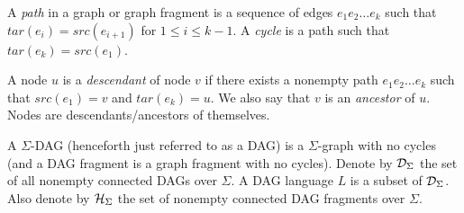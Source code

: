 \documentclass[11pt]{article}
\begin{document}
A \textit{path} in a graph or graph fragment is a sequence of edges
$e_1e_2\ldots e_k$ such that $tar(e_i) = src(e_{i+1})$ for $1 \le i \le k-1$. A
\textit{cycle} is a path such that $tar(e_k) = src(e_1)$. 

A node $u$ is a \textit{descendant} of node $v$ if there exists a nonempty path
$e_1e_2\ldots e_k$ such that $src(e_1) = v$ and $tar(e_k)=u$. We also say that
$v$ is an \textit{ancestor} of $u$. Nodes are descendants/ancestors of
themselves. 

\begin{definition}\label{def:dag} A $\Sigma$-DAG
  (henceforth just referred to as a DAG) is a $\Sigma$-graph with no cycles (and
  a DAG fragment is a graph fragment with no cycles). Denote by $\mathcal{D}_\Sigma$
  the set of all nonempty connected DAGs over $\Sigma$. A DAG language $L$ is a
  subset of $\mathcal{D}_\Sigma$. Also denote by $\mathcal{H}_\Sigma$ the set of nonempty
  connected DAG fragments over $\Sigma$. 
\end{definition}
\end{document}
